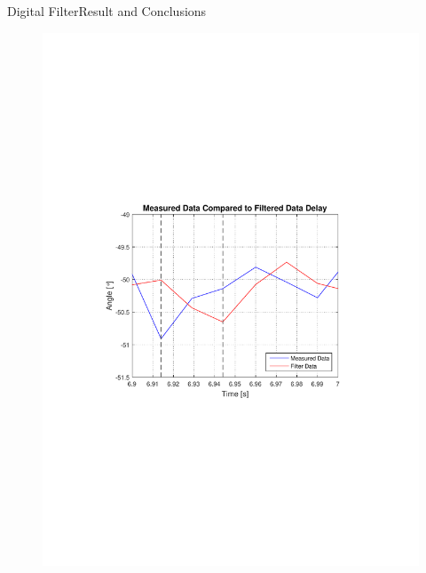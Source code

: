\begin{frame}{Digital Filter}{Result and Conclusions}
\vspace{-4cm}
  \begin{figure}
  \hspace{-.8cm}
    \includegraphics[scale = .5]{Pictures/FinalimplementationFilterDelay.pdf}
  \end{figure}
\end{frame}

